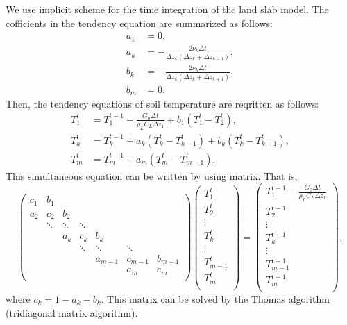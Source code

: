 We use implicit scheme for the time integration of the land slab model.
The cofficients in the tendency equation are summarized as follows:
\begin{align}
  a_{1} &= 0, \\
  a_{k} &= - \frac{2\nu_{k}\Delta t}{\Delta z_{k}(\Delta z_{k}+\Delta z_{k-1})}, \\
  b_{k} &= - \frac{2\nu_{k}\Delta t}{\Delta z_{k}(\Delta z_{k}+\Delta z_{k+1})}, \\
  b_{m} &= 0.
\end{align}
Then, the tendency equations of soil temperature are reqritten as follows:
\begin{align}
  T_{1}^{t} &= T_{1}^{t-1} - \frac{G_{0}\Delta t}{\rho_{L}C_{L}\Delta z_{1}} + b_{1} (T_{1}^{t}-T_{2}^{t}), \\
  T_{k}^{t} &= T_{k}^{t-1} + a_{k} (T_{k}^{t}-T_{k-1}^{t}) + b_{k} (T_{k}^{t}-T_{k+1}^{t}), \\
  T_{m}^{t} &= T_{m}^{t-1} + a_{m} (T_{m}^{t}-T_{m-1}^{t}).
\end{align}
This simultaneous equation can be written by using matrix. That is,
\begin{equation}
\begin{pmatrix}
  c_{1}  & b_{1}  &        &        &         &         &         \\
  a_{2}  & c_{2}  & b_{2}  &        &         &         &         \\
         & \ddots & \ddots & \ddots &         &         &         \\
         &        & a_{k}  & c_{k}  & b_{k}   &         &         \\
         &        &        & \ddots & \ddots  & \ddots  &         \\
         &        &        &        & a_{m-1} & c_{m-1} & b_{m-1} \\
         &        &        &        &         & a_{m}   & c_{m}   \\
\end{pmatrix}
\begin{pmatrix}
  T_{1}^{t}   \\
  T_{2}^{t}   \\
  \vdots      \\
  T_{k}^{t}   \\
  \vdots      \\
  T_{m-1}^{t} \\
  T_{m}^{t}   \\
\end{pmatrix}
=
\begin{pmatrix}
  T_{1}^{t-1} - \frac{G_{0}\Delta t}{\rho_{L}C_{L}\Delta z_{1}} \\
  T_{2}^{t-1}   \\
  \vdots        \\
  T_{k}^{t-1}   \\
  \vdots        \\
  T_{m-1}^{t-1} \\
  T_{m}^{t-1}   \\
\end{pmatrix}
,
\end{equation}
where $c_{k} = 1 - a_{k} - b_{k}$.
This matrix can be solved by the Thomas algorithm (tridiagonal matrix algorithm).

